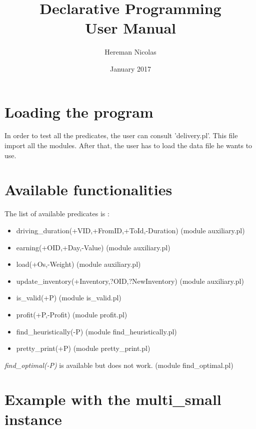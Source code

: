 \documentclass{article}
\title{Declarative Programming \\User Manual}
\author{Hereman Nicolas}
\date{January 2017}
\begin{document}
\maketitle

\section{Loading the program}

In order to test all the predicates, the user can consult 'delivery.pl'. This file import all the modules.
After that, the user has to load the data file he wants to use.

\section{Available functionalities}

The list of available predicates is :


\begin{itemize}
    \item driving\_duration(+VID,+FromID,+ToId,-Duration) (module auxiliary.pl)
    \item earning(+OID,+Day,-Value) (module auxiliary.pl)
    \item load(+Os,-Weight) (module auxiliary.pl)
    \item update\_inventory(+Inventory,?OID,?NewInventory) (module auxiliary.pl)
    \item is\_valid(+P) (module is\_valid.pl)
    \item profit(+P,-Profit) (module profit.pl)
    \item find\_heuristically(-P) (module find\_heuristically.pl)
    \item pretty\_print(+P) (module pretty\_print.pl)
\end{itemize}

\textit{find\_optimal(-P)} is available but does not work. (module find\_optimal.pl)

\newpage
\section{Example with the multi\_small instance}
\end{document}
